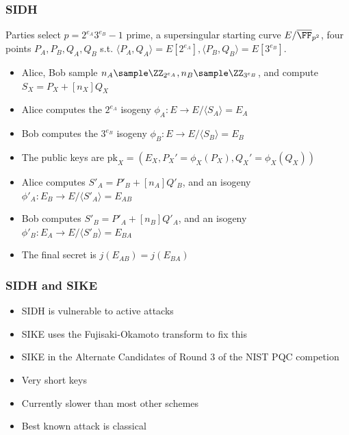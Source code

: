 \documentclass{beamer}
\begin{document}
\begin{frame}
    \frametitle{SIDH}
    Parties select $p = 2^{e_A} 3^{e_B} - 1$ prime, a supersingular starting curve $E/\overline{\FF}_{p^2}$, four points $P_A, P_B, Q_A, Q_B$ s.t.
    $\langle P_A, Q_A \rangle = E[2^{e_A}], \langle P_B, Q_B \rangle = E[3^{e_B}]$.
    \begin{itemize}
        \item Alice, Bob sample $n_A \sample \ZZ_{2^{e_A}}, n_B \sample \ZZ_{3^{e_B}}$, and compute $S_{X} = P_X + [n_X]Q_X$
        \item Alice computes the $2^{e_A}$ isogeny $\phi_A: E \to E/\langle S_A\rangle = E_A$
        \item Bob computes the $3^{e_B}$ isogeny $\phi_B: E \to E/\langle S_B\rangle = E_B$
        \item The public keys are $\mathrm{pk}_X = \left(E_X, P_X' = \phi_X(P_X), Q_X' = \phi_X(Q_X)\right)$
        \item Alice computes $S'_A = P'_B + [n_A] Q'_B$, and an isogeny $\phi'_A : E_B \to E/\langle S'_A \rangle = E_{AB}$
        \item Bob computes $S'_B = P'_A + [n_B] Q'_A$, and an isogeny $\phi'_B : E_A \to E/\langle S'_B \rangle = E_{BA}$
        \item The final secret is $j(E_{AB}) = j(E_{BA})$
    \end{itemize}
\end{frame}

\begin{frame}
    \frametitle{SIDH and SIKE}
    \begin{itemize}
        \item SIDH is vulnerable to active attacks
        \item SIKE uses the Fujisaki-Okamoto transform to fix this 
        \item SIKE in the Alternate Candidates of Round 3 of the NIST PQC competion
        \item Very short keys
        \item Currently slower than most other schemes
        \item Best known attack is classical
    \end{itemize} 
\end{frame}
\end{document}
